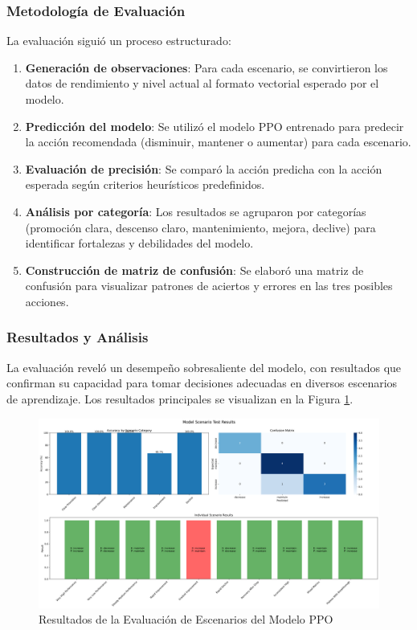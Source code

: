 \subsubsection{Metodología de Evaluación}

La evaluación siguió un proceso estructurado:

\begin{enumerate}
    \item \textbf{Generación de observaciones}: Para cada escenario, se convirtieron los datos de rendimiento y nivel actual al formato vectorial esperado por el modelo.
    
    \item \textbf{Predicción del modelo}: Se utilizó el modelo PPO entrenado para predecir la acción recomendada (disminuir, mantener o aumentar) para cada escenario.
    
    \item \textbf{Evaluación de precisión}: Se comparó la acción predicha con la acción esperada según criterios heurísticos predefinidos.
    
    \item \textbf{Análisis por categoría}: Los resultados se agruparon por categorías (promoción clara, descenso claro, mantenimiento, mejora, declive) para identificar fortalezas y debilidades del modelo.
    
    \item \textbf{Construcción de matriz de confusión}: Se elaboró una matriz de confusión para visualizar patrones de aciertos y errores en las tres posibles acciones.
\end{enumerate}

\subsubsection{Resultados y Análisis}

La evaluación reveló un desempeño sobresaliente del modelo, con resultados que confirman su capacidad para tomar decisiones adecuadas en diversos escenarios de aprendizaje. Los resultados principales se visualizan en la Figura \ref{fig:ppo-evaluation}.

\begin{figure}[h]
    \centering
    \includegraphics[width=\textwidth]{figuras/ppo-evaluation.png}
    \caption{Resultados de la Evaluación de Escenarios del Modelo PPO}
    \label{fig:ppo-evaluation}
\end{figure}

